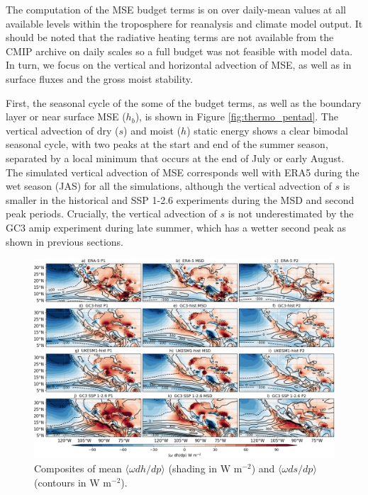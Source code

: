  The computation of the MSE budget terms is on over daily-mean values at all available levels within the troposphere for reanalysis and climate model output. It should be noted that the radiative heating terms are not available from the CMIP archive on daily scales so a full budget was not feasible with model data. In turn, we focus on the vertical and horizontal advection of MSE, as well as in surface fluxes and the gross moist stability.
 
  First, the seasonal cycle of the some of the budget terms, as well as the boundary layer or near surface MSE ($h_b$), is shown in Figure \ref{fig:thermo_pentad}. The vertical advection of dry ($s$) and moist ($h$) static energy shows a clear bimodal seasonal cycle, with two peaks at the start and end of the summer season, separated by a local minimum that occurs at the end of July or early August.
 The simulated vertical advection of MSE corresponds well with ERA5 during the wet season (JAS) for all the simulations, although the vertical advection of $s$ is smaller in the historical and SSP 1-2.6 experiments during the MSD and second peak periods. Crucially, the vertical advection of $s$ is not underestimated by the GC3 amip experiment during late summer, which has a wetter second peak as shown in previous sections. 

\begin{figure}[t!]
\includegraphics[width=\linewidth]{figures/thermocompositewdhdp.png}
\caption[Composites of vertical advection of dry and moist static energy]{Composites of mean $\langle \omega dh/dp \rangle$ (shading in W m$^{-2}$) and $\langle \omega ds/dp \rangle$ (contours in W m$^{-2}$).  }
\label{fig:wdhdpcompo}
\end{figure}  
 
